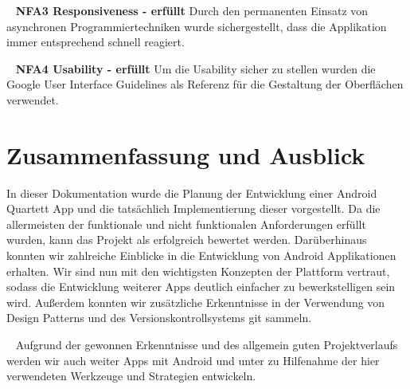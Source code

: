 \documentclass{scrartcl}
\begin{document}
\ \newline
\textbf{NFA3 Responsiveness - erfüllt} \newline
Durch den permanenten Einsatz von asynchronen Programmiertechniken wurde
sichergestellt, dass die Applikation immer entsprechend schnell reagiert.

\ \newline
\textbf{NFA4 Usability - erfüllt} \newline
Um die Usability sicher zu stellen wurden die Google User Interface Guidelines
als Referenz für die Gestaltung der Oberflächen verwendet.

\section{Zusammenfassung und Ausblick}

In dieser Dokumentation wurde die Planung der Entwicklung einer Android Quartett
App und die tatsächlich Implementierung dieser vorgestellt. Da die allermeisten
der funktionale und nicht funktionalen Anforderungen erfüllt wurden, kann das
Projekt als erfolgreich bewertet werden. Darüberhinaus konnten wir zahlreiche
Einblicke in die Entwicklung von Android Applikationen erhalten. Wir sind nun
mit den wichtigsten Konzepten der Plattform vertraut, sodass die Entwicklung
weiterer Apps deutlich einfacher zu bewerkstelligen sein wird. Außerdem konnten
wir zusätzliche Erkenntnisse in der Verwendung von Design Patterns und des
Versionskontrollsystems git sammeln.

\ \newline
Aufgrund der gewonnen Erkenntnisse und des allgemein guten Projektverlaufs werden
wir auch weiter Apps mit Android und unter zu Hilfenahme der hier verwendeten
Werkzeuge und Strategien entwickeln.
\end{document}
